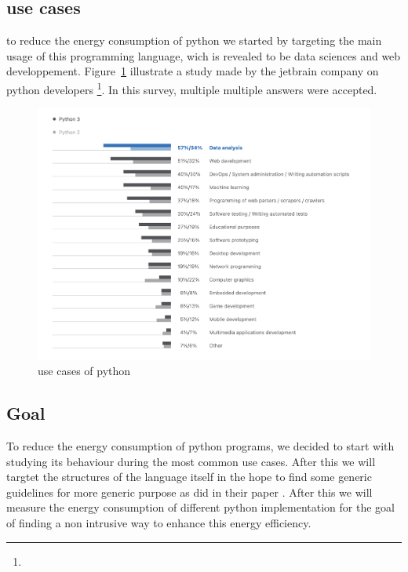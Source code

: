 \subsection{use cases}
to reduce the energy consumption of python we started by targeting the main usage of this programming language, wich is revealed to be data sciences and web developpement. Figure~\ref{fig:usecase} illustrate a study made by the jetbrain company on python developers \footnote{}. In this survey, multiple multiple answers were accepted.
\begin{figure}[hbt]
    \centering
    \includegraphics[width=\linewidth]{imgs/python_use_cases}
    \caption{use cases of python }
    \label{fig:usecase}
\end{figure}


\subsection*{Goal}
To reduce the energy consumption of python programs, we decided to start with studying its behaviour during the most common use cases. After this we will targtet the structures of the language itself in the hope to find some generic guidelines for more generic purpose as \citeauthor{hasan_energy_2016-1} did in their paper \cite{hasan_energy_2016-1}. After this we will measure the energy consumption of different python implementation for the goal of finding a non intrusive way to enhance this energy efficiency.



